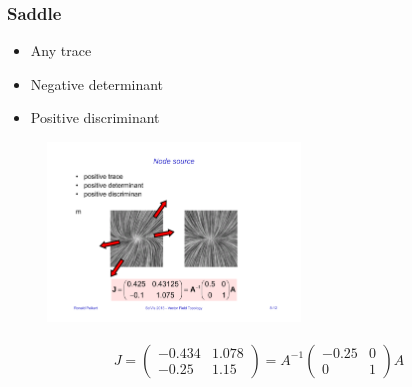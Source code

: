 \subsubsection{Saddle}
\begin{itemize}
    \item Any trace
    \item Negative determinant
    \item Positive discriminant
\end{itemize}
\begin{figure}[H]
    \centering
    \includegraphics[width=0.6\textwidth,page=3]{img/08_2d_critical_points}
\end{figure}
\begin{align*}
J = \begin{pmatrix}
     -0.434 & 1.078\\
     -0.25 & 1.15
 \end{pmatrix}
 = A ^{-1} 
     \begin{pmatrix}
         -0.25 & 0\\
         0 & 1
     \end{pmatrix}A
\end{align*}

